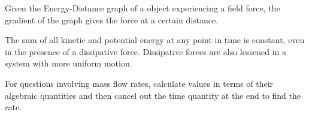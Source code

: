 \documentclass[../main]{subfiles}
\begin{document}
	Given the Energy-Distance graph of a object experiencing a field force, the gradient of the graph gives the force at a certain distance.


	The sum of all kinetic and potential energy at any point in time is constant, even in the presence of a dissipative force. Dissipative forces are also lessened in a system with more uniform motion.



	For questions involving mass flow rates, calculate values in terms of their algebraic quantities and then cancel out the time quantity at the end to find the rate.
\end{document}
